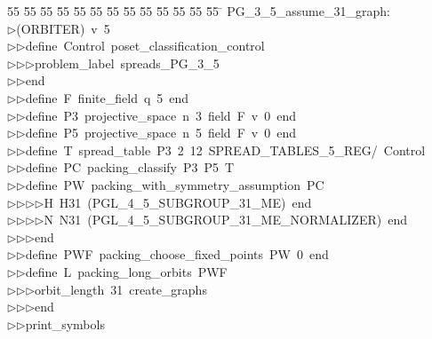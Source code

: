 %
%
\begin{tabbing}
55 \= 55 \= 55 \= 55 \= 55 \= 55 \= 55 \= 55 \= 55 \= 55 \= 55 \= 55 \= 55 \= \kill
PG\_3\_5\_assume\_31\_graph:\\[0pt]
$\triangleright$\>(ORBITER)\ v\ 5\ \\[0pt]
$\triangleright$\>$\triangleright$\>define\ Control\ poset\_classification\_control\ \\[0pt]
$\triangleright$\>$\triangleright$\>$\triangleright$\>problem\_label\ spreads\_PG\_3\_5\ \\[0pt]
$\triangleright$\>$\triangleright$\>end\ \\[0pt]
$\triangleright$\>$\triangleright$\>define\ F\ finite\_field\ q\ 5\ end\ \\[0pt]
$\triangleright$\>$\triangleright$\>define\ P3\ projective\_space\ n\ 3\ field\ F\ v\ 0\ end\ \\[0pt]
$\triangleright$\>$\triangleright$\>define\ P5\ projective\_space\ n\ 5\ field\ F\ v\ 0\ end\ \\[0pt]
$\triangleright$\>$\triangleright$\>define\ T\ spread\_table\ P3\ 2\ 12\ SPREAD\_TABLES\_5\_REG/\ Control\ \\[0pt]
$\triangleright$\>$\triangleright$\>define\ PC\ packing\_classify\ P3\ P5\ T\ \\[0pt]
$\triangleright$\>$\triangleright$\>define\ PW\ packing\_with\_symmetry\_assumption\ PC\ \\[0pt]
$\triangleright$\>$\triangleright$\>$\triangleright$\>$\triangleright$\>H\ H31\ (PGL\_4\_5\_SUBGROUP\_31\_ME)\ end\ \\[0pt]
$\triangleright$\>$\triangleright$\>$\triangleright$\>$\triangleright$\>N\ N31\ (PGL\_4\_5\_SUBGROUP\_31\_ME\_NORMALIZER)\ end\ \\[0pt]
$\triangleright$\>$\triangleright$\>$\triangleright$\>end\ \\[0pt]
$\triangleright$\>$\triangleright$\>define\ PWF\ packing\_choose\_fixed\_points\ PW\ 0\ end\ \\[0pt]
$\triangleright$\>$\triangleright$\>define\ L\ packing\_long\_orbits\ PWF\ \\[0pt]
$\triangleright$\>$\triangleright$\>$\triangleright$\>orbit\_length\ 31\ create\_graphs\ \\[0pt]
$\triangleright$\>$\triangleright$\>$\triangleright$\>end\ \\[0pt]
$\triangleright$\>$\triangleright$\>print\_symbols\\[0pt]
\end{tabbing}
